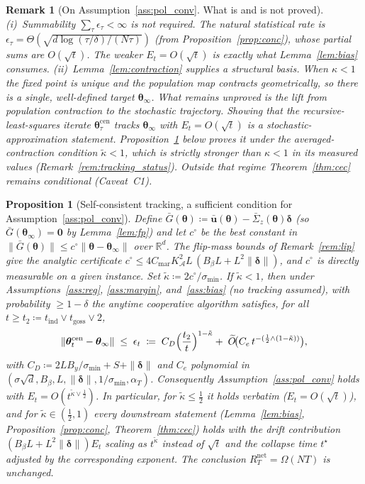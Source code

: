 \documentclass[11pt]{article}
\newtheorem{proposition}[theorem]{Proposition}
\newtheorem{remark}[theorem]{Remark}
\newcommand{\Ot}{\widetilde{O}}
\begin{document}
\begin{remark}[On Assumption~\ref{ass:pol_conv}. What is and is not
proved]\label{rem:pol_conv}
(i)~Summability $\sum_\tau\epsilon_\tau<\infty$ is not required. The
natural statistical rate is
$\epsilon_\tau=\Theta(\sqrt{d\log(\tau/\delta)/(N\tau)})$ (from
Proposition~\ref{prop:conc}), whose partial sums are
$O(\sqrt t)$. The weaker $E_t=O(\sqrt t)$ is exactly what
Lemma~\ref{lem:bias} consumes.
(ii)~Lemma~\ref{lem:contraction} supplies a structural basis. When
$\kappa<1$ the fixed point is unique and the \emph{population} map
contracts geometrically, so there is a single, well-defined target
$\bm{\theta}_\infty$.
What remains \emph{unproved} is the lift from population contraction to
the \emph{stochastic} trajectory. Showing that the recursive-least-squares
iterate $\bm{\theta}_\tau^{\mathrm{cen}}$ tracks $\bm{\theta}_\infty$
with $E_t=O(\sqrt t)$ is a stochastic-approximation statement.
Proposition~\ref{prop:tracking} below \emph{proves} it under the
averaged-contraction condition $\tilde\kappa<1$, which is strictly
stronger than $\kappa<1$ in its measured values
(Remark~\ref{rem:tracking_status}). Outside that regime
Theorem~\ref{thm:cec} remains conditional (Caveat~C1).
\end{remark}

\begin{proposition}[Self-consistent tracking, a sufficient condition
for Assumption~\ref{ass:pol_conv}]\label{prop:tracking}
Define $\bar G(\bm\theta)\coloneqq\bar{\bm u}(\bm\theta)
-\bar\Sigma_z(\bm\theta)\bm\delta$ (so $\bar G(\bm\theta_\infty)=\bm0$
by Lemma~\ref{lem:fp}) and let $c^\circ$ be the best constant in
$\|\bar G(\bm\theta)\|\leq c^\circ\|\bm\theta-\bm\theta_\infty\|$ over
$\mathbb R^d$. The flip-mass bounds of Remark~\ref{rem:lip} give the
analytic certificate
$c^\circ\leq 4C_{\mathrm{mar}}K_{\mathcal A}^2L\,
(B_\beta L+L^2\|\bm\delta\|)$, and $c^\circ$ is directly measurable on
a given instance.  Set
$\tilde\kappa\coloneqq 2c^\circ/\sigma_{\min}$.
If $\tilde\kappa<1$, then under Assumptions~\ref{ass:reg},
\ref{ass:margin}, and~\ref{ass:bias} (no tracking assumed), with
probability $\geq1-\delta$ the anytime cooperative algorithm satisfies,
for all $t\geq t_2\coloneqq t_{\mathrm{ind}}\vee t_{\mathrm{goss}}\vee2$,
\[
\|\bm\theta_t^{\mathrm{cen}}-\bm\theta_\infty\|
\;\leq\;\epsilon_t\;\coloneqq\;
C_D\Bigl(\frac{t_2}{t}\Bigr)^{1-\tilde\kappa}
+\;\Ot\!\bigl(C_e\,t^{-(\frac12\wedge(1-\tilde\kappa))}\bigr),
\]
with $C_D\coloneqq 2LB_y/\sigma_{\min}+S+\|\bm\delta\|$ and $C_e$
polynomial in $(\sigma\sqrt d,B_\beta,L,\|\bm\delta\|,
1/\sigma_{\min},\alpha_T)$.  Consequently
Assumption~\ref{ass:pol_conv} holds with
$E_t=O(t^{\tilde\kappa\vee\frac12})$. In particular, for
$\tilde\kappa\leq\tfrac12$ it holds verbatim ($E_t=O(\sqrt t)$), and
for $\tilde\kappa\in(\tfrac12,1)$ every downstream statement
(Lemma~\ref{lem:bias}, Proposition~\ref{prop:conc},
Theorem~\ref{thm:cec}) holds with the drift contribution
$(B_\beta L+L^2\|\bm\delta\|)E_t$ scaling as $t^{\tilde\kappa}$
instead of $\sqrt t$ and the collapse time $t^\star$ adjusted by the
corresponding exponent. The conclusion
$R_T^{\mathrm{net}}=\Omega(NT)$ is unchanged.
\end{proposition}
\end{document}
